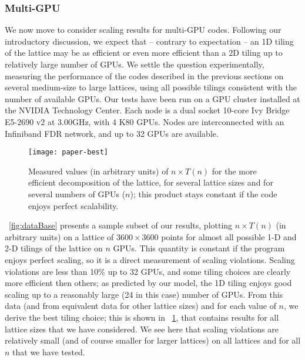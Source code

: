 \documentclass{elsarticle}
\begin{document}
\subsubsection*{Multi-GPU}

We now move to consider scaling results for multi-GPU codes. 
%
Following our introductory discussion, we expect that -- contrary to expectation -- 
an 1D tiling of the lattice may be as efficient or even more efficient than 
a 2D tiling up to relatively large number of GPUs. 
%
We settle the question experimentally, measuring the performance 
of the codes described in the previous sections on several medium-size 
to large lattices, using all possible tilings consistent with the number of 
available GPUs. 
%
Our tests have been run on a GPU cluster installed at the NVIDIA Technology Center. 
Each node is a dual socket 10-core Ivy Bridge E5-2690 v2 at 3.00GHz, with 
4 K80 GPUs.  
Nodes are interconnected with an Infiniband FDR network, and 
up to 32 GPUs are available. 

\begin{figure}[t]
\centering
\texttt{[image: paper-best]}
\caption{Measured values (in arbitrary units) of $n \times T(n)$   
for the more efficient decomposition of the lattice, for several lattice sizes
and for several numbers of GPUs ($n$); 
this product stays constant if the code enjoys perfect scalability.}
\label{fig:best}
\end{figure}

\figurename~\ref{fig:dataBase} presents a sample subset of our results,  
plotting  $n \times T(n)$  (in arbitrary units) on a lattice of 
$3600 \times 3600$ points for almost all possible 1-D and 2-D tilings 
of the lattice on $n$ GPUs. 
%
This quantity is constant if the program enjoys perfect scaling, so it is 
a direct measurement of scaling violations. 
%
Scaling violations are less than 10\% up to 32 GPUs, and 
some tiling choices are clearly more efficient then others; 
as predicted by our model, the 1D tiling enjoys good 
scaling up to a reasonably large (24 in this case) number of GPUs.
%
From this data (and from equivalent data for other lattice sizes) and 
for each value of $n$, we derive the best tiling choice; this is shown in 
\figurename~\ref{fig:best}, that contains results for all lattice sizes 
that we have considered. 
%
We see here that scaling violations are relatively small (and of course 
smaller for larger lattices) on all lattices and for all $n$ that we have 
tested.
\end{document}
